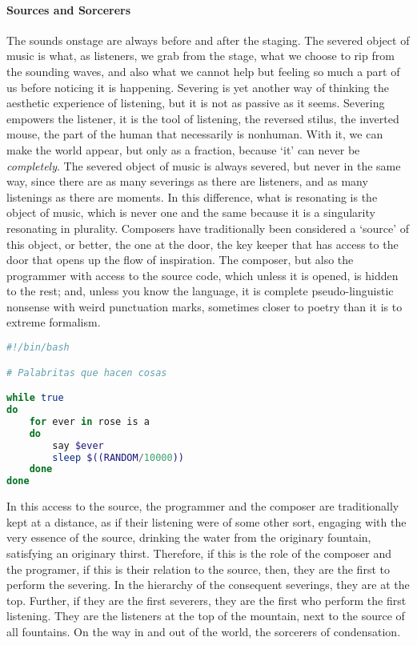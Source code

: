 \paragraph{Sources and Sorcerers}
The sounds onstage are always before and after the staging. The severed object of music is what, as listeners, we grab from the stage, what we choose to rip from the sounding waves, and also what we cannot help but feeling so much a part of us before noticing it is happening. Severing is yet another way of thinking the aesthetic experience of listening, but it is not as passive as it seems. Severing empowers the listener, it is the tool of listening, the reversed stilus, the inverted mouse, the part of the human that necessarily is nonhuman. With it, we can make the world appear, but only as a fraction, because `it' can never be \textit{completely}. The severed object of music is always severed, but never in the same way, since there are as many severings as there are listeners, and as many listenings as there are moments. In this difference, what is resonating is the object of music, which is never one and the same because it is a singularity resonating in plurality. Composers have traditionally been considered a `source' of this object, or better, the one at the door, the key keeper that has access to the door that opens up the flow of inspiration. The composer, but also the programmer with access to the source code, which unless it is opened, is hidden to the rest; and, unless you know the language, it is complete pseudo-linguistic nonsense with weird punctuation marks, sometimes closer to poetry than it is to extreme formalism. 

\begin{flushleft}
\small
\begin{lstlisting}[caption={Little words that do things},captionpos=b,language=bash,mathescape=false]
#!/bin/bash

# Palabritas que hacen cosas

while true
do
	for ever in rose is a
	do 
		say $ever
		sleep $((RANDOM/10000))
	done
done

\end{lstlisting}
\end{flushleft}

In this access to the source, the programmer and the composer are traditionally kept at a distance, as if their listening were of some other sort, engaging with the very essence of the source, drinking the water from the originary fountain, satisfying an originary thirst. Therefore, if this is the role of the composer and the programer, if this is their relation to the source, then, they are the first to perform the severing. In the hierarchy of the consequent severings, they are at the top. Further, if they are the first severers, they are the first who perform the first listening. They are the listeners at the top of the mountain, next to the source of all fountains. On the way in and out of the world, the sorcerers of condensation.

